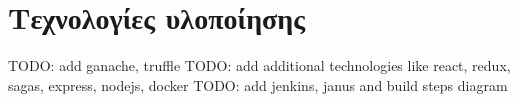 \section{Τεχνολογίες υλοποίησης}

TODO: add ganache, truffle
TODO: add additional technologies like react, redux, sagas, express, nodejs, docker
TODO: add jenkins, janus and build steps diagram
